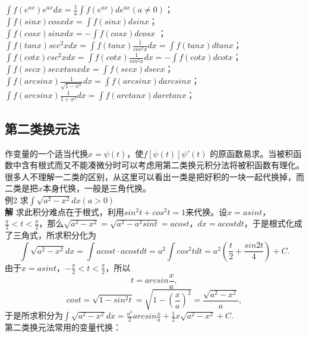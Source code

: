 \documentclass[UTF8]{ctexart}
\begin{document}
\quad\quad\quad\quad $\displaystyle{\int f(e^{ax})e^{ax}dx=\frac{1}{a}\int f(e^{ax})de^{ax}(a \neq 0)}$；\quad $\displaystyle{\int f(sinx)cosxdx=\int f(sinx)dsinx}$；\quad\quad\quad
\\ $\displaystyle{\int f(cosx)sinxdx=-\int f(cosx)dcosx}$ ；\quad\quad\quad\quad\quad $\displaystyle{\int f(tanx)sec^2xdx=\int f(tanx)\frac{1}{cos^2x}dx=\int f(tanx)dtanx}$；
\\ $\displaystyle{\int f(cotx)csc^2xdx=\int f(cotx)\frac{1}{sin^2x}dx=-\int f(cotx)dcotx}$；
\quad\quad\quad\quad $\displaystyle{\int f(secx)secxtanxdx=\int f(secx)dsecx}$；
\\ $\displaystyle{\int f(arcsinx)\frac{1}{\sqrt{1-x^2}}dx=\int f(arcsinx)darcsinx}$；
\\$\displaystyle{\int f(arcsinx)\frac {1}{1+x^2}dx=\int f(arctanx)darctanx}$；
\vspace{-4mm} \subsection{第二类换元法}  \vspace{-2mm} \small 作变量的一个适当代换$x=\psi (t)$，使$f[\psi(t)]\psi'(t)$ 的原函数易求。当被积函数中含有根式而又不能凑微分时可以考虑用第二类换元积分法将被积函数有理化。很多人不理解一二类的区别，从这里可以看出一类是把好积的一块一起代换掉，而二类是把$x$本身代换，一般是三角代换。
\\ 例2 \quad 求$\displaystyle{\int \sqrt{a^2-x^2}dx}(a>0)$
\\\textbf{解} 求此积分难点在于根式，利用$sin^2t+cos^2t=1$来代换。设$x=asint$，$\displaystyle{\frac{\pi}{2}<t<\frac{\pi}{2}}$，那么$\sqrt{a^2-x^2}=\sqrt{a^2-a^2sint}=acost$，$dx=acostdt$，于是根式化成了三角式，所求积分化为
\\ $$\displaystyle{\int \sqrt{a^2-x^2}dx=\int acost \cdot acost dt=a^2 \int cos^2 t dt=a^2(\frac{t}{2}+\frac{sin2t}{4})+C}.$$
由于$x=asint$，$\displaystyle{-\frac{\pi}{2}<t<\frac{\pi}{2}}$，所以
$$t=arcsin\frac{x}{a},$$
$$\displaystyle{cost=\sqrt{1-sin^2t}=\sqrt{1-(\frac{x}{a})^2}=\frac{\sqrt{a^2-x^2}}{a}},$$
于是所求积分为$\displaystyle{\int \sqrt{a^2-x^2}dx=\frac{a^2}{2}arcsin\frac{x}{a}+\frac{1}{2}x\sqrt{a^2-x^2}+C}.$
\\第二类换元法常用的变量代换：
\end{document}
